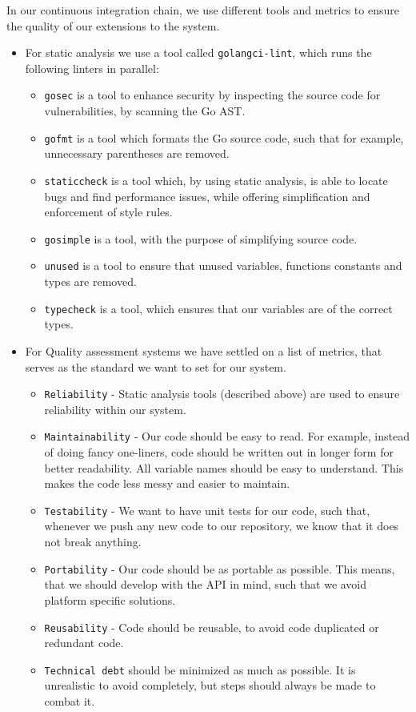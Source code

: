 In our continuous integration chain, we use different tools and metrics to ensure the quality of our extensions to the system.
\begin{itemize}
    \item For static analysis we use a tool called \texttt{golangci-lint}, which runs the following linters in parallel:
    \begin{itemize}
        \item \texttt{gosec} is a tool to enhance security by inspecting the source code for vulnerabilities, by scanning the Go AST.
        \item \texttt{gofmt} is a tool which formats the Go source code, such that for example, unnecessary parentheses are removed.
        \item \texttt{staticcheck} is a tool which, by using static analysis, is able to locate bugs and find performance issues, while offering simplification and enforcement of style rules.
        \item \texttt{gosimple} is a tool, with the purpose of simplifying source code.
        \item \texttt{unused} is a tool to ensure that unused variables, functions constants and types are removed.
        \item \texttt{typecheck} is a tool, which ensures that our variables are of the correct types.
    \end{itemize}
    \item For Quality assessment systems we have settled on a list of metrics, that serves as the standard we want to set for our system.
    \begin{itemize}
        \item \texttt{Reliability} - Static analysis tools (described above) are used to ensure reliability within our system.
        \item \texttt{Maintainability} - Our code should be easy to read. For example, instead of doing fancy one-liners, code should be written out in longer form for better readability. All variable names should be easy to understand. This makes the code less messy and easier to maintain.
        \item \texttt{Testability} - We want to have unit tests for our code, such that, whenever we push any new code to our repository, we know that it does not break anything.
        \item \texttt{Portability} - Our code should be as portable as possible. This means, that we should develop with the API in mind, such that we avoid platform specific solutions.
        \item \texttt{Reusability} - Code should be reusable, to avoid code duplicated or redundant code. 
        \item \texttt{Technical debt} should be minimized as much as possible. It is unrealistic to avoid completely, but steps should always be made to combat it. 
    \end{itemize}    
\end{itemize}

